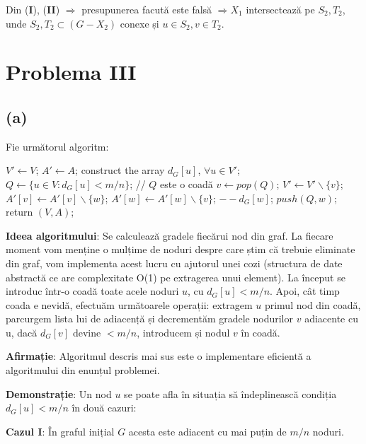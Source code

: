 \documentclass[a4paper,12pt]{article}
\begin{document}
Din (\textbf{I}), (\textbf{II}) $\Rightarrow$ presupunerea facută este falsă $\Rightarrow X_1$ intersectează pe $S_2, T_2$, unde $S_2,T_2 \subset (G-X_2)$ conexe și $u \in S_2, v \in T_2$.

\section{Problema III}

\subsection{(a)}
	
Fie următorul algoritm:
\begin{algorithm}[h]
	\begin{algorithmic}[1]
		\State $V' \gets V$; $A' \gets A$;
		\State construct the array $d_G[u]$, $\forall u \in V'$;
		\State $Q \gets \{ u \in V : d_G[u] < m/n \}$; // $Q$ este o coadă
			\State $v \gets pop(Q)$;
			\State $V' \gets V' \backslash \{v\}$;
				\State $A'[v] \gets A'[v] \backslash \{w\}$;
				\State $A'[w] \gets A'[w] \backslash \{v\}$;
				\State $--d_G[w]$;
					 \State $push(Q,w)$;
				\EndIf
			\EndFor
		\EndWhile
		\State return $(V,A)$;
	\end{algorithmic}
\end{algorithm}	

\textbf{Ideea algoritmului}: Se calculează gradele fiecărui nod din graf. La fiecare moment vom menține o mulțime de noduri despre care știm că trebuie eliminate din graf, vom implementa acest lucru cu ajutorul unei cozi (structura de date abstractă ce are complexitate O(1) pe extragerea unui element). La început se introduc într-o coadă toate acele noduri $u$, cu $d_G[u] < m/n$. Apoi, cât timp coada e nevidă, efectuăm următoarele operații: extragem $u$ primul nod din coadă, parcurgem lista lui de adiacență și decrementăm gradele nodurilor $v$ adiacente cu u, dacă $d_G[v]$ devine $ < m/n$, introducem și nodul $v$ în coadă.

\textbf{Afirmație}: Algoritmul descris mai sus este o implementare eficientă a algoritmului din enunțul problemei.

\textbf{Demonstrație}: Un nod $u$ se poate afla în situația să îndeplinească condiția $d_G[u] < m/n$ în două cazuri:

\textbf{Cazul I}: În graful inițial $G$ acesta este adiacent cu mai puțin de $m/n$ noduri.
\end{document}

